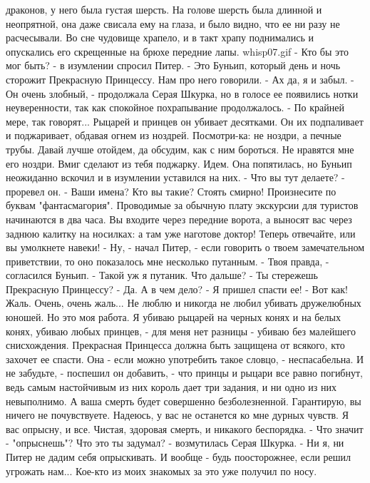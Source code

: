 драконов, у него была густая шерсть. На голове шерсть была длинной и 
неопрятной, она даже свисала ему на глаза, и было видно, что ее ни 
разу не расчесывали. Во сне чудовище храпело, и в такт храпу 
поднимались и опускались его скрещенные на брюхе передние лапы.
    {whisp07.gif}
    - Кто бы это мог быть? - в изумлении спросил Питер.
    - Это Буньип, который день и ночь сторожит Прекрасную Принцессу. 
Нам про него говорили.
    - Ах да, я и забыл.
    - Он очень злобный, - продолжала Серая Шкурка, но в голосе ее 
появились нотки неуверенности, так как спокойное похрапывание 
продолжалось. - По крайней мере, так говорят... Рыцарей и принцев он 
убивает десятками. Он их подпаливает и поджаривает, обдавая огнем из 
ноздрей. Посмотри-ка: не ноздри, а печные трубы. Давай лучше отойдем, 
да обсудим, как с ним бороться. Не нравятся мне его ноздри. Вмиг 
сделают из тебя поджарку. Идем.
    Она попятилась, но Буньип неожиданно вскочил и в изумлении 
уставился на них.
    - Что вы тут делаете? - проревел он. - Ваши имена? Кто вы такие? 
Стоять смирно! Произнесите по буквам "фантасмагория". Проводимые за 
обычную плату экскурсии для туристов начинаются в два часа. Вы входите 
через передние ворота, а выносят вас через заднюю калитку на носилках: 
а там уже наготове доктор! Теперь отвечайте, или вы умолкнете навеки!
    - Ну, - начал Питер, - если говорить о твоем замечательном 
приветствии, то оно показалось мне несколько путанным.
    - Твоя правда, - согласился Буньип. - Такой уж я путаник. Что 
дальше?
    - Ты стережешь Прекрасную Принцессу?
    - Да. А в чем дело?
    - Я пришел спасти ее!
    - Вот как! Жаль. Очень, очень жаль... Не люблю и никогда не любил 
убивать дружелюбных юношей. Но это моя работа. Я убиваю рыцарей на 
черных конях и на белых конях, убиваю любых принцев, - для меня нет 
разницы - убиваю без малейшего снисхождения. Прекрасная Принцесса 
должна быть защищена от всякого, кто захочет ее спасти.
    Она - если можно употребить такое словцо, - неспасабельна. И не 
забудьте, - поспешил он добавить, - что принцы и рыцари все равно 
погибнут, ведь самым настойчивым из них король дает три задания, и ни 
одно из них невыполнимо. А ваша смерть будет совершенно 
безболезненной. Гарантирую, вы ничего не почувствуете. Надеюсь, у вас 
не останется ко мне дурных чувств. Я вас опрысну, и все. Чистая, 
здоровая смерть, и никакого беспорядка.
    - Что значит - "опрыснешь"? Что это ты задумал? - возмутилась 
Серая Шкурка. - Ни я, ни Питер не дадим себя опрыскивать. И вообще - 
будь поосторожнее, если решил угрожать нам... Кое-кто из моих знакомых 
за это уже получил по носу.
